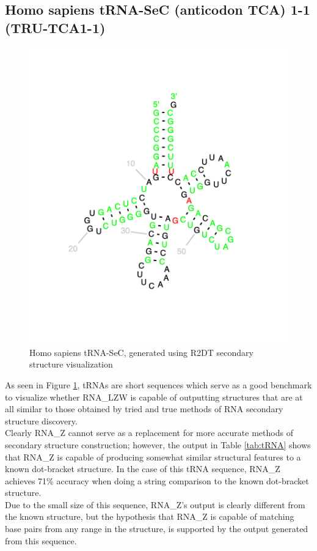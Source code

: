 \documentclass[sigconf]{acmart}
\begin{document}
\subsection{Homo sapiens tRNA-SeC (anticodon TCA) 1-1 (TRU-TCA1-1)}

\begin{figure}
  \includegraphics[width=\linewidth]{for_paper1.png}
  \caption{Homo sapiens tRNA-SeC, generated using R2DT secondary structure visualization}
  \label{fig:tRNA}
\end{figure}

As seen in Figure \ref{fig:tRNA},  tRNAs are short sequences which serve as a good benchmark to visualize whether RNA\_LZW is capable of outputting structures that are at all similar to those obtained by tried and true methods of RNA secondary structure discovery. \\
Clearly RNA\_Z cannot serve as a replacement for more accurate methods of secondary structure construction; however, the output in Table \ref{tab:tRNA} shows that RNA\_Z is capable of producing somewhat similar structural features to a known dot-bracket structure.  In the case of this tRNA sequence,  RNA\_Z achieves 71\% accuracy when doing a string comparison to the known dot-bracket structure. \\
Due to the small size of this sequence, RNA\_Z's output is clearly different from the known structure, but the hypothesis that RNA\_Z is capable of matching base pairs from any range in the structure, is supported by the output generated from this sequence. 
\end{document}
